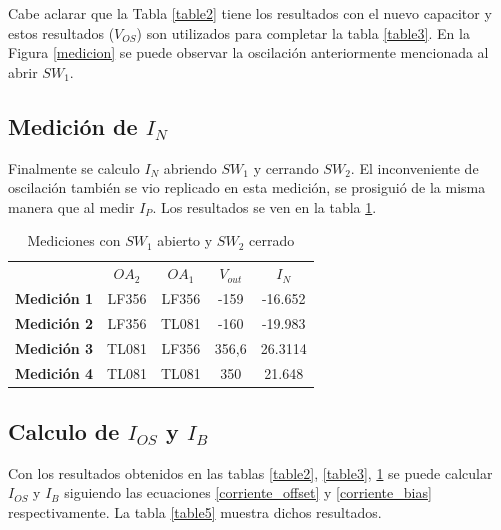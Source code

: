 Cabe aclarar que la Tabla \ref{table2} tiene los resultados con el nuevo capacitor y estos resultados ($V_{OS}$) son utilizados para completar la tabla \ref{table3}. 
En la Figura \ref{medicion} se puede observar la oscilación anteriormente mencionada al abrir $SW_1$. 


\subsection{Medición de $I_{N}$}


Finalmente se calculo $I_N$ abriendo $SW_1$ y cerrando $SW_2$. El inconveniente de oscilación también se vio replicado en esta medición, se prosiguió de la misma manera que al medir $I_P$.  
Los resultados se ven en la tabla \ref{table4}.

\begin{table}[h!]
    \centering
    \caption{Mediciones con $SW_1$ abierto y $SW_2$ cerrado}
    \label{table4}
    \begin{tabular}{@{}ccccc@{}}
    \textbf{}           & \textbf{$OA_2$} & \textbf{$OA_1$} & \textbf{$V_{out}$} & \textbf{$I_N$} \\ 
    \textbf{Medición 1} & LF356          & LF356          & -159              &  -16.652            \\
    \textbf{Medición 2} & LF356          & TL081          & -160              &  -19.983            \\
    \textbf{Medición 3} & TL081          & LF356          & 356,6              &  26.3114            \\
    \textbf{Medición 4} & TL081          & TL081          & 350              &  21.648            \\ 
    \end{tabular}
\end{table}


\subsection{Calculo de $I_{OS}$ y $I_B$}

Con los resultados obtenidos en las tablas \ref{table2}, \ref{table3}, \ref{table4} se puede calcular $I_{OS}$ y $I_B$ siguiendo las ecuaciones \ref{corriente_offset} y \ref{corriente_bias} respectivamente. La tabla  \ref{table5} muestra dichos resultados.



